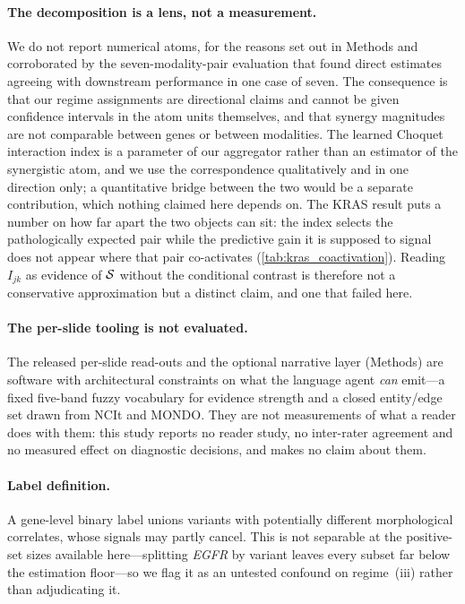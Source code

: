 \paragraph{The decomposition is a lens, not a measurement.}
We do not report numerical atoms, for the reasons set out in Methods and
corroborated by the seven-modality-pair evaluation that found direct
estimates agreeing with downstream performance in one case of
seven.\cite{zhang2025evaluatingpid} The consequence is that our regime
assignments are directional claims and cannot be given confidence
intervals in the atom units themselves, and that synergy magnitudes are
not comparable between genes or between modalities. The learned Choquet
interaction index is a parameter of our aggregator rather than an
estimator of the synergistic atom, and we use the correspondence
qualitatively and in one direction only; a quantitative bridge between
the two would be a separate contribution, which nothing claimed here
depends on. The KRAS result puts a number on how far apart the two
objects can sit: the index selects the pathologically expected pair
while the predictive gain it is supposed to signal does not appear
where that pair co-activates
(\cref{tab:kras_coactivation}). Reading $I_{jk}$ as evidence of
$\mathcal{S}$ without the conditional contrast is therefore not a
conservative approximation but a distinct claim, and one that failed
here.

\paragraph{The per-slide tooling is not evaluated.}
The released per-slide read-outs and the optional narrative layer
(Methods) are software with architectural constraints on what the
language agent \emph{can} emit---a fixed five-band fuzzy vocabulary for
evidence strength and a closed entity/edge set drawn from NCIt and
MONDO. They are not measurements of what a reader does with them: this
study reports no reader study, no inter-rater agreement and no measured
effect on diagnostic decisions, and makes no claim about them.

\paragraph{Label definition.}
A gene-level binary label unions variants with potentially different
morphological correlates, whose signals may partly cancel. This is not
separable at the positive-set sizes available here---splitting
\textit{EGFR} by variant leaves every subset far below the estimation
floor---so we flag it as an untested confound on regime~(iii) rather than
adjudicating it.

